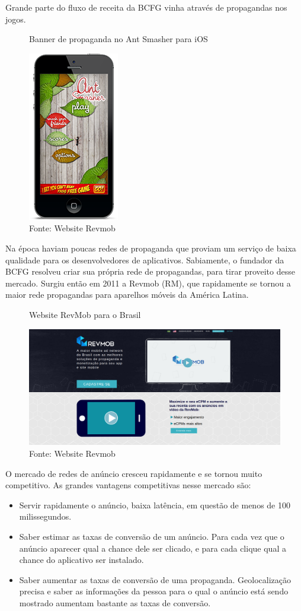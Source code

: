 Grande parte do fluxo de receita da BCFG vinha através de propagandas nos jogos.
\begin{figure}[H]
\caption{Banner de propaganda no Ant Smasher para iOS}
\centerline{\includegraphics[scale=0.5]{img/antsmasheriOS}}
\label{fig:antsmasheriOS}
\caption* {Fonte: Website Revmob}
\end{figure}

Na época haviam poucas redes de propaganda que proviam um serviço de baixa qualidade para os desenvolvedores de aplicativos. Sabiamente, o fundador da BCFG resolveu criar sua própria rede de propagandas, para tirar proveito desse mercado. Surgiu então em 2011 a Revmob (RM), que rapidamente se tornou a maior rede propagandas para aparelhos móveis da América Latina.

\begin{figure}[H]
\caption{Website RevMob para o Brasil}
\centerline{\includegraphics[scale=0.5]{img/screenshotSiteRev}}
\label{fig:screenshotSiteRev}
\caption* {Fonte: Website Revmob}
\end{figure}

O mercado de redes de anúncio cresceu rapidamente e se tornou muito competitivo. As grandes vantagens competitivas nesse mercado são:
\begin{itemize}
\item Servir rapidamente o anúncio, baixa latência, em questão de menos de 100 milissegundos.
\item Saber estimar as taxas de conversão de um anúncio. Para cada vez que o anúncio aparecer qual a chance dele ser clicado, e para cada clique qual a chance do aplicativo ser instalado.
\item Saber aumentar as taxas de conversão de uma propaganda. Geolocalização precisa e saber as informações da pessoa para o qual o anúncio está sendo mostrado aumentam bastante as taxas de conversão.
\end{itemize}

